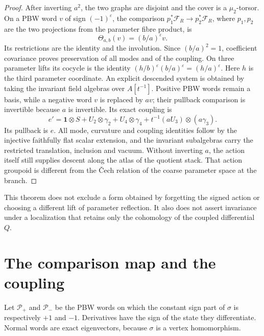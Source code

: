 \begin{proof}
After inverting $a^2$, the two graphs are disjoint and the cover is a
$\mu_2$-torsor. On a PBW word $v$ of sign $(-1)^\varepsilon$, the
comparison $p_1^*\mathcal F_R\longrightarrow p_2^*\mathcal F_R$,
where $p_1,p_2$ are the two projections from the parameter fibre
product, is
\[
 \Theta_{a,b}(v)=(b/a)^\varepsilon v.
\]
Its restrictions are the identity and the involution. Since
$(b/a)^2=1$, coefficient covariance proves preservation of all modes
and of the coupling. On three parameter lifts its cocycle is the
identity $(h/b)^\varepsilon(b/a)^\varepsilon=(h/a)^\varepsilon$.
Here $h$ is the third parameter coordinate. An explicit descended
system is obtained by taking the invariant field algebras over
$A[t^{-1}]$. Positive PBW words remain a basis, while a negative word
$v$ is replaced by $av$; their pullback comparison is invertible
because $a$ is invertible. Its exact coupling is
\[
 e'=\mathbf1\otimes S+U_2\otimes\gamma_2+U_4\otimes\gamma_4
       +t^{-1}(aU_3)\otimes(a\gamma_3).
\]
Its pullback is $e$. All mode, curvature and coupling identities follow
by the injective faithfully flat scalar extension, and the invariant
subalgebras carry the restricted translation, inclusion and vacuum.
Without
inverting $a$, the action itself still supplies descent along the
atlas of the quotient stack. That action groupoid is different from
the \v{C}ech relation of the coarse parameter space at the branch.
\qedhere
\end{proof}

This theorem does not exclude a form obtained by forgetting the signed
action or choosing a different lift of parameter reflection. It also
does not assert invariance under a localization that retains only the
cohomology of the coupled differential $Q$.

\section{The comparison map and the coupling}

Let $\mathcal P_+$ and $\mathcal P_-$ be the PBW words on which the
constant sign part of $\sigma$ is respectively $+1$ and $-1$.
Derivatives have the sign of the state they differentiate. Normal
words are exact eigenvectors, because $\sigma$ is a vertex
homomorphism.

